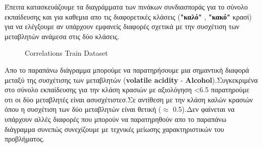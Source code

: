 \documentclass[12pt,a4paper]{article}
\begin{document}
\par Έπειτα κατασκευάζουμε τα διαγράμματα των πινάκων συνδιασποράς για το σύνολο εκπαίδευσης και για καθεμια απο τις διαφορετικές κλάσεις (\textbf{"καλό"} , \textbf{"κακό"} κρασί) για να ελέγξουμε αν υπάρχουν εμφανείς διαφορές σχετικά με την συσχέτιση των μεταβλητών ανάμεσα στις δύο κλάσεις.


\begin{figure}[H]
    \centering
    \qquad
    \caption{Correlations Train Dataset}%
    \label{fig:example}%
\end{figure}

Απο το παραπάνω διάγραμμα μπορούμε να παρατηρήσουμε μια σημαντική διαφορά μεταξύ της συσχέτισης των μεταβλητών (\textbf{volatile acidity} - \textbf{Alcohol}).Συγκεκριμένα στο σύνολο εκπαίδευσης για την κλάση κρασιών με αξιολόγηση <6.5 παρατηρούμε οτι οι δύο μεταβλητές είναι ασυσχέτιστεσ.Σε αντίθεση με την κλάση καλών κρασιών όπου η συσχέτιση των δύο μεταβλητών είναι θετική ($ \approx$ 0.5).Δεν φαίνεται να υπάρχουν αλλές διαφορές που μπορούν να παρατηρηθούν απο το παραπάνω διάγραμμα συνεπώς συνεχίζουμε με τεχνικές μείωσης χαρακτηριστικών του προβλήματος.
\end{document}
